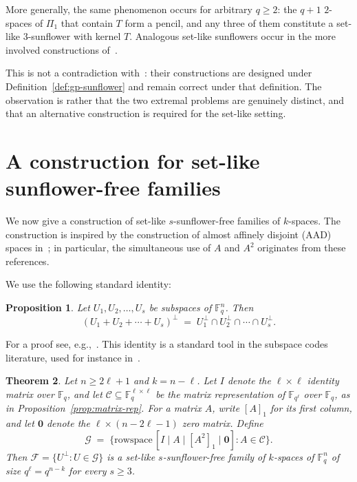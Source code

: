 \documentclass[11pt]{article}
\newtheorem{theorem}{Theorem}
\newtheorem{proposition}[theorem]{Proposition}
\theoremstyle{definition}
\newcommand{\F}{\mathbb{F}}
\newcommand{\rs}{\mathrm{rowspace}\,}
\begin{document}
More generally, the same phenomenon occurs for arbitrary $q \geq 2$: the $q+1$ $2$-spaces of $\Pi_1$ that contain $T$ form a pencil, and any three of them constitute a set-like $3$-sunflower with kernel $T$. Analogous set-like sunflowers occur in the more involved constructions of~\cite[\S3.3, \S3.4]{ik2026}.

This is not a contradiction with~\cite{ik2026}: their constructions are designed under Definition~\ref{def:gp-sunflower} and remain correct under that definition. The observation is rather that the two extremal problems are genuinely distinct, and that an alternative construction is required for the set-like setting.

\section{A construction for set-like sunflower-free families}\label{sec:construction}

We now give a construction of set-like $s$-sunflower-free families of $k$-spaces. The construction is inspired by the construction of almost affinely disjoint (AAD) spaces in~\cite{aad-isit, aad-2024, aad-ffa}; in particular, the simultaneous use of $A$ and $A^2$ originates from these references.

We use the following standard identity:

\begin{proposition}\label{prop:sum-complement}
Let $U_1, U_2, \ldots, U_s$ be subspaces of $\F_q^n$. Then
\[
(U_1 + U_2 + \cdots + U_s)^\perp \;=\; U_1^\perp \cap U_2^\perp \cap \cdots \cap U_s^\perp.
\]
\end{proposition}

For a proof see, e.g.,~\cite{otal-thesis}. This identity is a standard tool in the subspace codes literature, used for instance in~\cite{ekop-subspace-packings}.

\begin{theorem}\label{thm:construction}
Let $n \geq 2\ell + 1$ and $k = n - \ell$. Let $I$ denote the $\ell \times \ell$ identity matrix over $\F_q$, and let $\mathcal{C} \subseteq \F_q^{\ell \times \ell}$ be the matrix representation of $\F_{q^\ell}$ over $\F_q$, as in Proposition~\ref{prop:matrix-rep}. For a matrix $A$, write $[A]_1$ for its first column, and let $\mathbf{0}$ denote the $\ell \times (n - 2\ell - 1)$ zero matrix. Define
\[
\mathcal{G} \;=\; \bigl\{ \rs [I \mid A \mid [A^2]_1 \mid \mathbf{0}] : A \in \mathcal{C}\bigr\}.
\]
Then $\mathcal{F} = \{U^\perp : U \in \mathcal{G}\}$ is a set-like $s$-sunflower-free family of $k$-spaces of $\F_q^n$ of size $q^\ell = q^{n-k}$ for every $s \geq 3$.
\end{theorem}
\end{document}

